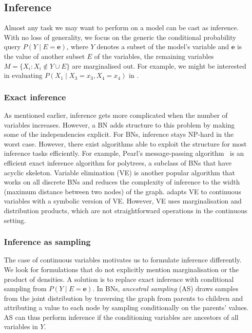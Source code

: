 \subsection{Inference}
Almost any task we may want to perform on a model can be cast as inference. With no loss of generality, we focus on the generic the conditional probability query $P(Y\mid E=\bm{e})$, where $Y$ denotes a subset of the model's variable and $\bm{e}$ is the value of another subset $E$ of the variables, the remaining variables $M = \{X_i: X_i \notin Y \cup E \}$ are marginalised out. For example, we might be interested in evaluating $P(X_1\mid X_3=x_3, X_4=x_4)$ in .

\subsubsection{Exact inference}
As mentioned earlier, inference gets more complicated when the number of variables increases. However, a BN adds structure to this problem by making some of the independencies explicit. For BNs, inference stays NP-hard in the worst case. However, there exist algorithms able to exploit the structure for most inference tasks efficiently. For example, Pearl's message-passing algorithm~\citep{pearl1987distributed} is an efficient exact inference algorithm for polytrees, a subclass of BNs that have acyclic skeleton. Variable elimination (VE) is another popular algorithm that works on all discrete BNs and reduces the complexity of inference to the width (maximum distance between two nodes) of the graph. \citet{sanner2012symbolic} adapts VE to continuous variables with a symbolic version of VE. However, VE uses marginalisation and distribution products, which are not straightforward operations in the continuous setting.

\subsubsection{Inference as sampling}
The case of continuous variables motivates us to formulate inference differently. We look for formulations that do not explicitly mention marginalisation or the product of densities. A solution is to replace exact inference with conditional sampling from $P(Y\mid E=\bm{e})$. In BNs, \textit{ancestral sampling} (AS) draws samples from the joint distribution by traversing the graph from parents to children and attributing a value to each node by sampling conditionally on the parents' values. AS can thus perform inference if the conditioning variables are ancestors of all variables in $Y$.

